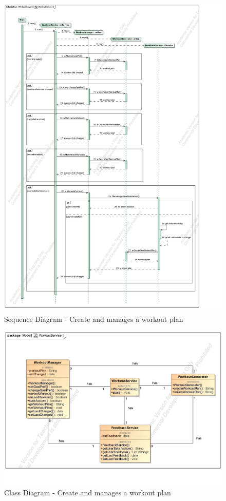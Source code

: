 \documentclass{article}
\begin{document}
		\begin{figure}[h!]
			\centering
			\captionsetup{labelformat=empty}
			\caption{Sequence Diagram - Create and manages a workout plan}
		    	\includegraphics[scale=0.75, angle=0]{Marc/workout/WorkoutServiceSequence.pdf}
		\end{figure}
		\clearpage
		\begin{figure}[h!]
			\centering
			\captionsetup{labelformat=empty}
			\caption{Class Diagram - Create and manages a workout plan}
		    	\includegraphics[width=\textwidth, angle=0]{Marc/workout/WorkoutServiceClass.pdf}
		\end{figure}
		\clearpage
\end{document}

